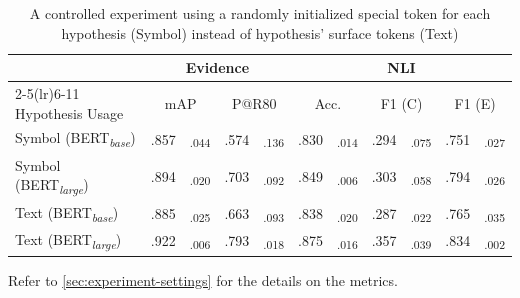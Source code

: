 \begin{table}[t]
    \centering
    \begin{threeparttable}
        \centering
        \fontsize{8pt}{10pt}\selectfont
        \setlength{\tabcolsep}{2pt}
        \renewcommand{\arraystretch}{.6}
        \begin{tabular}{lc@{\hskip0pt}cc@{\hskip0pt}cc@{\hskip0pt}cc@{\hskip0pt}cc@{\hskip0pt}c}\toprule
            & \multicolumn{4}{c}{Evidence} & \multicolumn{6}{c}{NLI} \\\cmidrule(lr){2-5}\cmidrule(lr){6-11}
            Hypothesis Usage & \multicolumn{2}{c}{mAP} & \multicolumn{2}{c}{P@R80} & \multicolumn{2}{c}{Acc.} & \multicolumn{2}{c}{F1 (C)} & \multicolumn{2}{c}{F1 (E)} \\\midrule
            Symbol (BERT\textsubscript{\textit{base}})  & .857 & \textsubscript{.044} & .574 & \textsubscript{.136} & .830 & \textsubscript{.014} & .294 & \textsubscript{.075} & .751 & \textsubscript{.027} \\
            Symbol (BERT\textsubscript{\textit{large}}) & .894 & \textsubscript{.020} & .703 & \textsubscript{.092} & .849 & \textsubscript{.006} & .303 & \textsubscript{.058} & .794 & \textsubscript{.026} \\
            \midrule
            Text (BERT\textsubscript{\textit{base}})  & .885 & \textsubscript{.025} & .663 & \textsubscript{.093} & .838 & \textsubscript{.020} & .287 & \textsubscript{.022} & .765 & \textsubscript{.035} \\
            Text (BERT\textsubscript{\textit{large}}) & .922 & \textsubscript{.006} & .793 & \textsubscript{.018} & .875 & \textsubscript{.016} & .357 & \textsubscript{.039} & .834 & \textsubscript{.002} \\
            \bottomrule
        \end{tabular}
        \makeatletter\def\TPT@hsize{}\makeatletter
        \begin{tablenotes}
            \raggedright
            \fontsize{7pt}{7pt}\selectfont
            Refer to \cref{sec:experiment-settings} for the details on the metrics.
        \end{tablenotes}
    \end{threeparttable}
    \caption{A controlled experiment using a randomly initialized special token for each hypothesis (Symbol) instead of hypothesis' surface tokens (Text)}\label{tab:results-symbolic}
\end{table}
